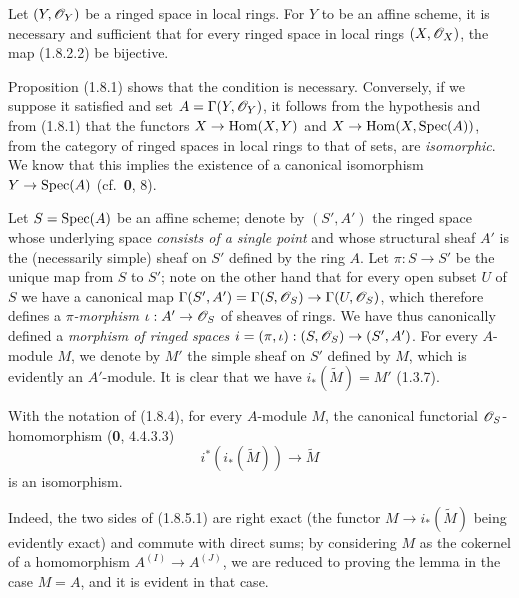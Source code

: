 \begin{corollary}[1.8.3]
\label{ega2:addendum:I.1.8.3}
Let $(Y,\mathscr{O}_Y)$ be a ringed space in local rings. For $Y$
to be an affine scheme, it is necessary and sufficient that for every
ringed space in local rings $(X,\mathscr{O}_X)$, the map \textup{(1.8.2.2)} be
bijective.
\end{corollary}

Proposition (1.8.1) shows that the condition is necessary.
Conversely, if we suppose it satisfied and set
$A=\Gamma(Y,\mathscr{O}_Y)$, it follows from the hypothesis and from (1.8.1) that
the functors $X\to\operatorname{Hom}(X,Y)$ and
$X\to\operatorname{Hom}(X,\operatorname{Spec}(A))$, from the category of ringed spaces in
local rings to that of sets, are \emph{isomorphic}. We know that
this implies the existence of a canonical isomorphism
$Y\to\operatorname{Spec}(A)$ (cf.~\textbf{0}, 8).

\begin{env}[1.8.4]
\label{ega2:addendum:I.1.8.4}
Let $S=\operatorname{Spec}(A)$ be an affine scheme; denote by $(S',A')$ the ringed
space whose underlying space \emph{consists of a single point} and whose
structural sheaf $A'$ is the (necessarily simple) sheaf on $S'$ defined
by the ring $A$. Let $\pi:S\to S'$ be the unique map from $S$ to
$S'$; note on the other hand that for every open subset $U$ of $S$ we have a
canonical map
$\Gamma(S',A')=\Gamma(S,\mathscr{O}_S)\to\Gamma(U,\mathscr{O}_S)$, which therefore
defines a \emph{$\pi$-morphism} $\iota:A'\to\mathscr{O}_S$ of sheaves of rings.
We have thus canonically defined a \emph{morphism of ringed spaces}
$i=(\pi,\iota):(S,\mathscr{O}_S)\to(S',A')$. For every $A$-module $M$, we
denote by $M'$ the simple sheaf on $S'$ defined by $M$, which
is evidently an $A'$-module. It is clear that we have
$i_*(\widetilde M)=M'$ (1.3.7).
\end{env}

\begin{lemma}[1.8.5]
\label{ega2:addendum:I.1.8.5}
With the notation of (1.8.4), for every $A$-module $M$, the
canonical functorial $\mathscr{O}_S$-homomorphism \textup{(\textbf{0}, 4.4.3.3)}
\begin{equation}
\label{ega2:addendum:I.1.8.5.1}
  i^*(i_*(\widetilde M))\to\widetilde M
\tag{1.8.5.1}
\end{equation}
is an isomorphism.
\end{lemma}

Indeed, the two sides of (1.8.5.1) are right exact (the
functor $M\to i_*(\widetilde M)$ being evidently exact) and
commute with direct sums; by considering $M$ as the cokernel of a
homomorphism $A^{(I)}\to A^{(J)}$, we are reduced to proving the lemma
in the case $M=A$, and it is evident in that case.

